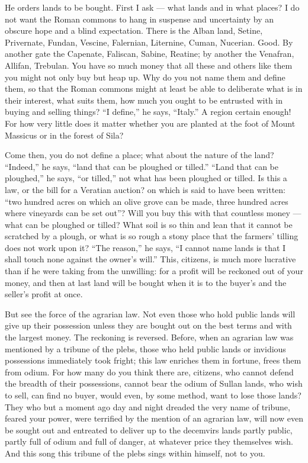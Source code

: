  He orders lands to be bought. First I ask --- what lands and in what places? I do not want the Roman commons to hang in suspense and uncertainty by an obscure hope and a blind expectation. There is the Alban land, Setine, Privernate, Fundan, Vescine, Falernian, Liternine, Cuman, Nucerian. Good. By another gate the Capenate, Faliscan, Sabine, Reatine; by another the Venafran, Allifan, Trebulan. You have so much money that all these and others like them you might not only buy but heap up. Why do you not name them and define them, so that the Roman commons might at least be able to deliberate what is in their interest, what suits them, how much you ought to be entrusted with in buying and selling things? ``I define,'' he says, ``Italy.'' A region certain enough! For how very little does it matter whether you are planted at the foot of Mount Massicus or in the forest of Sila?

 Come then, you do not define a place; what about the nature of the land? ``Indeed,'' he says, ``land that can be ploughed or tilled.'' ``Land that can be ploughed,'' he says, ``or tilled,'' not what has been ploughed or tilled. Is this a law, or the bill for a Veratian auction? on which is said to have been written: ``two hundred acres on which an olive grove can be made, three hundred acres where vineyards can be set out''? Will you buy this with that countless money --- what can be ploughed or tilled? What soil is so thin and lean that it cannot be scratched by a plough, or what is so rough a stony place that the farmers' tilling does not work upon it? ``The reason,'' he says, ``I cannot name lands is that I shall touch none against the owner's will.'' This, citizens, is much more lucrative than if he were taking from the unwilling: for a profit will be reckoned out of your money, and then at last land will be bought when it is to the buyer's and the seller's profit at once.

 But see the force of the agrarian law. Not even those who hold public lands will give up their possession unless they are bought out on the best terms and with the largest money. The reckoning is reversed. Before, when an agrarian law was mentioned by a tribune of the plebs, those who held public lands or invidious possessions immediately took fright; this law enriches them in fortune, frees them from odium. For how many do you think there are, citizens, who cannot defend the breadth of their possessions, cannot bear the odium of Sullan lands, who wish to sell, can find no buyer, would even, by some method, want to lose those lands? They who but a moment ago day and night dreaded the very name of tribune, feared your power, were terrified by the mention of an agrarian law, will now even be sought out and entreated to deliver up to the decemvirs lands partly public, partly full of odium and full of danger, at whatever price they themselves wish. And this song this tribune of the plebs sings within himself, not to you.

